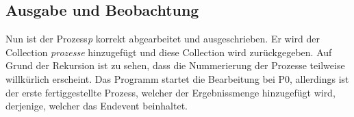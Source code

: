 \subsection{Ausgabe und Beobachtung}
Nun ist der Prozess\textit{p} korrekt abgearbeitet und ausgeschrieben. Er wird der Collection \textit{prozesse} hinzugefügt und diese Collection wird zurückgegeben. Auf Grund der Rekursion ist zu sehen, dass die Nummerierung der Prozesse teilweise willkürlich erscheint. Das Programm startet die Bearbeitung bei P0, allerdings ist der erste fertiggestellte Prozess, welcher der Ergebnissmenge hinzugefügt wird, derjenige, welcher das Endevent beinhaltet.












